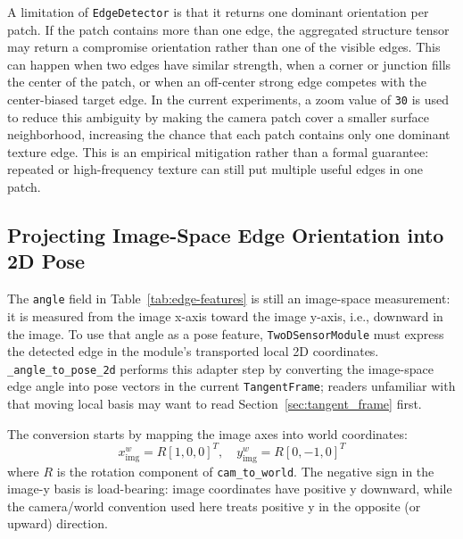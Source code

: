 \documentclass{article}
\begin{document}
A limitation of \texttt{EdgeDetector} is that it returns one dominant orientation per patch.
If the patch contains more than one edge, the aggregated structure tensor may return a compromise orientation rather than one of the visible edges.
This can happen when two edges have similar strength, when a corner or junction fills the center of the patch, or when an off-center strong edge competes with the center-biased target edge.
In the current experiments, a zoom value of \texttt{30} is used to reduce this ambiguity by making the camera patch cover a smaller surface neighborhood, increasing the chance that each patch contains only one dominant texture edge.
This is an empirical mitigation rather than a formal guarantee: repeated or high-frequency texture can still put multiple useful edges in one patch.

\subsection{Projecting Image-Space Edge Orientation into 2D Pose}

The \texttt{angle} field in Table~\ref{tab:edge-features} is still an image-space measurement: it is measured from the image x-axis toward the image y-axis, i.e., downward in the image.
To use that angle as a pose feature, \texttt{TwoDSensorModule} must express the detected edge in the module's transported local 2D coordinates.
\texttt{\_angle\_to\_pose\_2d} performs this adapter step by converting the image-space edge angle into pose vectors in the current \texttt{TangentFrame}; readers unfamiliar with that moving local basis may want to read Section~\ref{sec:tangent_frame} first.

The conversion starts by mapping the image axes into world coordinates:
\[
  x_{\mathrm{img}}^{w} = R[1, 0, 0]^T,
  \quad
  y_{\mathrm{img}}^{w} = R[0, -1, 0]^T
\]
where $R$ is the rotation component of \texttt{cam\_to\_world}.
The negative sign in the image-y basis is load-bearing: image coordinates have positive y downward, while the camera/world convention used here treats positive y in the opposite (or upward) direction.
\end{document}
